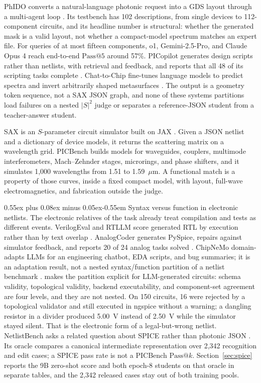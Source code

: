 \documentclass[11pt]{article}
\makeatletter
\renewcommand\paragraph{\@startsection{paragraph}{4}{\z@}%
  {0.55ex plus 0.08ex minus 0.05ex}{-0.55em}%
  {\normalfont\normalsize\bfseries}}
\newcommand{\passk}[1]{\mathrm{Pass@}#1}
\makeatother
\begin{document}
PhIDO converts a natural-language photonic request into a GDS layout through a multi-agent loop \citep{sharma2025phido}.
Its testbench has 102 descriptions, from single devices to 112-component circuits, and its headline number is structural: whether the generated mask is a valid layout, not whether a compact-model spectrum matches an expert file.
For queries of at most fifteen components, o1, Gemini-2.5-Pro, and Claude Opus 4 reach end-to-end $\passk{5}$ around 57\%.
PICopilot generates design scripts rather than netlists, with retrieval and feedback, and reports that all 48 of its scripting tasks complete \citep{jiang2026picopilot}.
Chat-to-Chip fine-tunes language models to predict spectra and invert arbitrarily shaped metasurfaces \citep{zhang2025chattoschip}.
The output is a geometry token sequence, not a SAX JSON graph, and none of these systems partitions load failures on a nested $|S|^2$ judge or separates a reference-JSON student from a teacher-answer student.

SAX is an $S$-parameter circuit simulator built on JAX \citep{laporte2023sax}.
Given a JSON netlist and a dictionary of device models, it returns the scattering matrix on a wavelength grid.
PICBench builds models for waveguides, couplers, multimode interferometers, Mach--Zehnder stages, microrings, and phase shifters, and it simulates 1{,}000 wavelengths from 1.51 to 1.59~$\mu$m.
A functional match is a property of those curves, inside a fixed compact model, with layout, full-wave electromagnetics, and fabrication outside the judge.

\paragraph{Syntax versus function in electronic netlists.}
The electronic relatives of the task already treat compilation and tests as different events.
VerilogEval and RTLLM score generated RTL by execution rather than by text overlap \citep{liu2023verilogeval,lu2024rtllm}.
AnalogCoder generates PySpice, repairs against simulator feedback, and reports 20 of 24 analog tasks solved \citep{lai2024analogcoder}.
ChipNeMo domain-adapts LLMs for an engineering chatbot, EDA scripts, and bug summaries; it is an adaptation result, not a nested syntax/function partition of a netlist benchmark \citep{liu2023chipnemo}.
\citet{hedayati2026levels} makes the partition explicit for LLM-generated circuits: schema validity, topological validity, backend executability, and component-set agreement are four levels, and they are not nested.
On 150 circuits, 16 were rejected by a topological validator and still executed in ngspice without a warning; a dangling resistor in a divider produced 5.00~V instead of 2.50~V while the simulator stayed silent.
That is the electronic form of a legal-but-wrong netlist.
NetlistBench asks a related question about SPICE rather than photonic JSON \citep{ma2026netlistbench}.
Its oracle compares a canonical intermediate representation over 2{,}342 recognition and edit cases; a SPICE pass rate is not a PICBench $\passk{k}$.
Section~\ref{sec:spice} reports the 9B zero-shot score and both epoch-8 students on that oracle in separate tables, and the 2{,}342 released cases stay out of both training pools.
\end{document}
